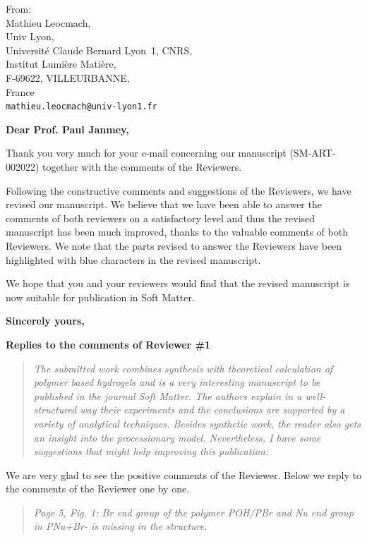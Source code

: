 \documentclass[a4paper, parskip=true, firsthead=false, fromemail=true, foldmarks=false]{scrlttr2}
\newenvironment{quotationi}
{\begin{quotation}\itshape}
{\end{quotation}}
\newcommand{\journal}{Soft Matter}
\begin{document}
\begin{letter}{From:\\
Mathieu Leocmach,\\
Univ Lyon,\\ 
Universit\'e Claude Bernard Lyon~1, CNRS,\\
Institut Lumi\`ere Mati\`ere,\\
F-69622, VILLEURBANNE,\\
France\\
\texttt{mathieu.leocmach@univ-lyon1.fr}
}
\opening{\bf Dear Prof. Paul Janmey,}

Thank you very much for your e-mail concerning our manuscript (SM\nobreakdash-ART-002022) together with the comments of the Reviewers. 

Following the constructive comments and suggestions of the Reviewers, we have revised our manuscript. 
We believe that we have been able to answer the comments of both reviewers on a satisfactory level and thus the revised manuscript has been much improved, thanks to the valuable comments of both Reviewers. We note that the parts revised to answer the Reviewers have been highlighted with blue characters in the revised manuscript.


We hope that you and your reviewers would find that the revised manuscript is now suitable for publication in \journal. 

\closing{\bf Sincerely yours,} 
\clearpage

\textsf{\textbf{Replies to the comments of Reviewer \#1}}

\begin{quotationi}
The submitted work combines synthesis with theoretical calculation of polymer based hydrogels and is a very interesting manuscript to be published in the journal Soft Matter. The authors explain in a well-structured way their experiments and the conclusions are supported by a variety of analytical techniques. Besides synthetic work, the reader also gets an insight into the processionary model. Nevertheless, I have some suggestions that might help improving this publication:
\end{quotationi}

We are very glad to see the positive comments of the Reviewer. Below we reply to the comments of the Reviewer one by one. 


\begin{quotationi}
Page 5, Fig. 1: Br end group of the polymer POH/PBr and Nu end group in PNu+Br- is missing in the structure.
\end{quotationi}


\end{letter}
\end{document}
